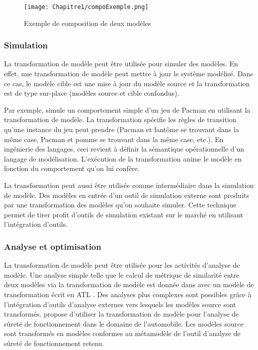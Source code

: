\begin{figure}[!htbp]
 \begin{center}
  \texttt{[image: Chapitre1/compoExemple.png]}
 \end{center}
 \caption{Exemple de composition de deux modèles}
 \label{fig:compoExemple}
\end{figure}

\subsubsection{Simulation}
La transformation de modèle peut être utilisée pour simuler des modèles. En effet, une transformation de modèle peut mettre à jour le système modélisé. Dans ce cas, le modèle cible est une mise à jour du modèle source et la transformation est de type sur-place (modèles source et cible confondus). 

Par exemple, \cite{syriani2011multi} simule un comportement simple d'un jeu de Pacman en utilisant la transformation de modèle. La transformation spécifie les règles de transition qu'une instance du jeu peut prendre (Pacman et fantôme se trouvant dans la même case, Pacman et pomme se trouvant dans la même case, etc.). En ingénierie des langages, ceci revient à définir la sémantique opérationnelle d'un langage de modélisation. L'exécution de la transformation anime le modèle en fonction du comportement qu'on lui confère.

La transformation peut aussi être utilisée comme intermédiaire dans la simulation de modèle. Des modèles en entrée d'un outil de simulation externe sont produits par une transformation des modèles qu'on souhaite simuler. Cette technique permet de tirer profit d'outils de simulation existant sur le marché en utilisant l'intégration d'outils.

\subsubsection{Analyse et optimisation}

La transformation de modèle peut être utilisée pour les activités d'analyse de modèle. Une analyse simple telle que le calcul de métrique de similarité entre deux modèles via la transformation de modèle est donnée dans \cite{del2007semi} avec un modèle de transformation écrit en ATL \cite{jouault2006transforming}. Des analyses plus complexes sont possibles grâce à l'intégration d'outils d'analyse externes vers lesquels les modèles source sont transformés. \cite{biehl2010integrating} propose d'utiliser la transformation de modèle pour l'analyse de sûreté de fonctionnement dans le domaine de l'automobile. Les modèles source sont transformés en modèles conformes au métamodèle de l'outil d'analyse de sûreté de fonctionnement retenu.
 
